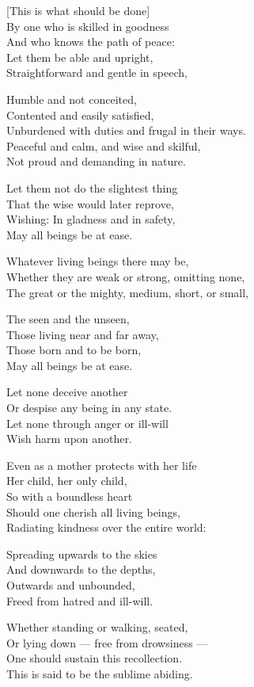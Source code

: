[This is what should be done]\\
By one who is skilled in goodness\\
And who knows the path of peace:\\
Let them be able and upright,\\
Straightforward and gentle in speech,

Humble and not conceited,\\
Contented and easily satisfied,\\
Unburdened with duties and frugal in their ways.\\
Peaceful and calm, and wise and skilful,\\
Not proud and demanding in nature.

Let them not do the slightest thing\\
That the wise would later reprove,\\
Wishing: In gladness and in safety,\\
May all beings be at ease.

Whatever living beings there may be,\\
Whether they are weak or strong, omitting none,\\
The great or the mighty, medium, short, or small,

The seen and the unseen,\\
Those living near and far away,\\
Those born and to be born,\\
May all beings be at ease.

Let none deceive another\\
Or despise any being in any state.\\
Let none through anger or ill-will\\
Wish harm upon another.

Even as a mother protects with her life\\
Her child, her only child,\\
So with a boundless heart\\
Should one cherish all living beings,\\
Radiating kindness over the entire world:

Spreading upwards to the skies\\
And downwards to the depths,\\
Outwards and unbounded,\\
Freed from hatred and ill-will.

Whether standing or walking, seated, \\
Or lying down --- free from drowsiness ---\\
One should sustain this recollection.\\
This is said to be the sublime abiding.

